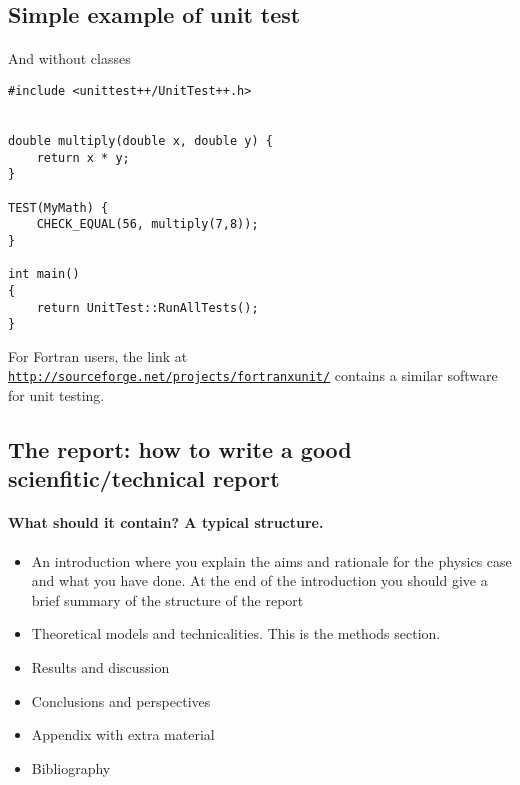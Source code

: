 \documentclass[%
oneside,                 %
final,                   %
10pt]{article}
\begin{document}
\subsection*{Simple example of unit test}

\paragraph{}
And without classes
\begin{verbatim}
#include <unittest++/UnitTest++.h>


double multiply(double x, double y) {
    return x * y;
}

TEST(MyMath) {
    CHECK_EQUAL(56, multiply(7,8));
}

int main()
{
    return UnitTest::RunAllTests();
} 
\end{verbatim}
For Fortran users, the link at \href{{http://sourceforge.net/projects/fortranxunit/}}{\nolinkurl{http://sourceforge.net/projects/fortranxunit/}} contains a similar
software for unit testing.




\subsection*{The report: how to write a good scienfitic/technical report}

\paragraph{What should it contain? A typical structure.}
\begin{itemize}
 \item An introduction where you explain the aims and rationale for the physics case and  what you have done. At the end of the introduction you should give a brief summary of the structure of the report

 \item Theoretical models and technicalities. This is the methods section.

 \item Results and discussion

 \item Conclusions and perspectives

 \item Appendix with extra material

 \item Bibliography
\end{itemize}
\end{document}
